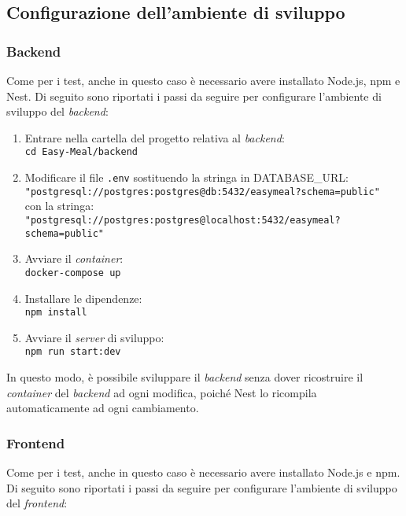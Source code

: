 \subsection{Configurazione dell'ambiente di sviluppo}


\subsubsection{Backend}
Come per i test, anche in questo caso è necessario avere installato Node.js, npm e Nest.
Di seguito sono riportati i passi da seguire per configurare l'ambiente di sviluppo del \textit{backend}:
\begin{enumerate}
	\item Entrare nella cartella del progetto relativa al \textit{backend}: \\
		\texttt{cd Easy-Meal/backend}
	\item Modificare il file \texttt{.env} sostituendo la stringa in DATABASE\_URL: \\
		\texttt{"postgresql://postgres:postgres@db:5432/easymeal?schema=public"}\\
		con la stringa: \\
		\texttt{"postgresql://postgres:postgres@localhost:5432/easymeal?schema=public"}
	\item Avviare il \textit{container}: \\
		\texttt{docker-compose up}
	\item Installare le dipendenze: \\
		\texttt{npm install}
	\item Avviare il \textit{server} di sviluppo: \\
		\texttt{npm run start:dev}
\end{enumerate}
In questo modo, è possibile sviluppare il \textit{backend} senza dover ricostruire il \textit{container} del \textit{backend} ad ogni modifica, poiché Nest lo ricompila automaticamente ad ogni cambiamento.


\subsubsection{Frontend}
Come per i test, anche in questo caso è necessario avere installato Node.js e
npm.
Di seguito sono riportati i passi da seguire per configurare l'ambiente di
sviluppo del \textit{frontend}:

